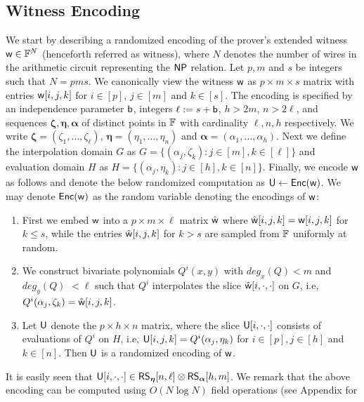 


\subsection{Witness Encoding}\label{sec:witencoding}
We start by describing a randomized encoding of the prover's extended witness
$\mathsf{w}\in \mathbb{F}^N$ (henceforth referred as witness), where $N$ denotes the number
of wires in the arithmetic circuit representing the $\mathsf{NP}$ relation. Let $p,m$ and $s$ be
integers such that $N=pms$. We canonically view the
witness $\mathsf{w}$ 
as $p\times m\times s$ matrix with entries $\mathsf{w}[i,j,k]$ for $i\in [p]$,
$j\in [m]$ and $k\in [s]$. The encoding is specified by an independence 
parameter $\mathsf{b}$, integers $\ell := s+\mathsf{b}$, $h>2m$, $n>2\ell$, and sequences
$\bm{\zeta},\bm{\eta},\bm{\alpha}$ of distinct points in $\mathbb{F}$ with cardinality 
$\ell,n,h$ respectively. We write $\bm{\zeta}=(\zeta_1,\ldots,\zeta_\ell)$,
$\bm{\eta}=(\eta_1,\ldots,\eta_n)$ and $\bm{\alpha}=(\alpha_1,\ldots,\alpha_h)$. 
Next we define the interpolation domain $G$ as $G=\{(\alpha_j,\zeta_k): j\in[m],
k\in [\ell]\}$ and evaluation domain $H$ as $H=\{(\alpha_j,\eta_k): j\in [h],
k\in [n]\}$. Finally, we encode $\mathsf{w}$ as follows and denote the below randomized computation as $\mathsf{U}\gets \mathsf{Enc}(\mathsf{w})$.
 We may denote $\mathsf{Enc}(\mathsf{w})$ as the random variable denoting the encodings of $\mathsf{w}$:
\begin{enumerate}[{\rm (i)}]
\item First we embed $\mathsf{w}$ into a $p\times m\times \ell$ matrix $\hat{\mathsf{w}}$
where $\hat{\mathsf{w}}[i,j,k]=\mathsf{w}[i,j,k]$ for $k\leq s$, while the entries
$\hat{\mathsf{w}}[i,j,k]$ for $k>s$ are sampled from $\mathbb{F}$ uniformly at random.
\item We construct bivariate polynomials $Q^i(x,y)$ with $deg_x(Q)<m$ and
$deg_y(Q) $ $<\ell$ such that $Q^i$ interpolates the slice
$\hat{\mathsf{w}}[i,\cdot,\cdot]$ on $G$, i.e,
$Q^i(\alpha_j,\zeta_k)=\hat{\mathsf{w}}[i,j,k]$. 
\item Let $\mathsf{U}$ denote the $p\times h\times n$ matrix, where the slice
$\mathsf{U}[i,\cdot,\cdot]$ consists of evaluations of $Q^i$ on $H$, i.e,
$\mathsf{U}[i,j,k]=Q^i(\alpha_j,\eta_k)$ for $i\in [p], j\in [h]$ and $k\in [n]$.
Then $\mathsf{U}$ is a randomized encoding of $\mathsf{w}$.
\end{enumerate}
 It is easily seen
that $\mathsf{U}[i,\cdot,\cdot]\in \mathsf{RS}_{\bm{\eta}}[n,\ell]\otimes \mathsf{RS}_{\bm{\alpha}}[h,m]$. 
We remark that the above
encoding can be computed using $O(N\log N)$ field operations (see Appendix for
